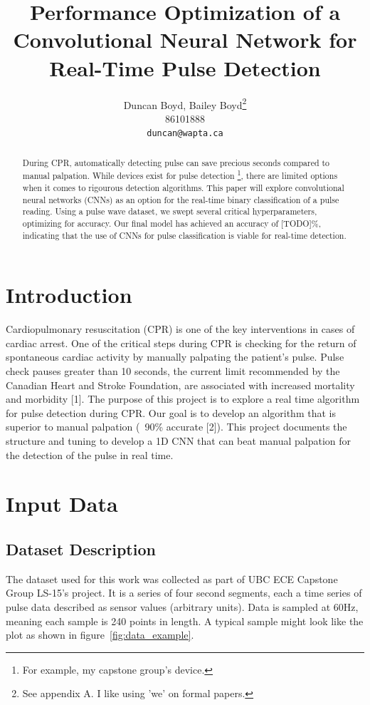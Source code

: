\documentclass{article}
\title{Performance Optimization of a Convolutional Neural Network for Real-Time Pulse Detection}
\author{
  Duncan Boyd, Bailey Boyd\thanks{See appendix A. I like using 'we' on formal papers.} \\
  86101888 \\
  \texttt{duncan@wapta.ca} \\
}
\begin{document}
\maketitle


\begin{abstract}
  During CPR, automatically detecting pulse can save precious seconds compared to manual palpation. While devices exist for pulse detection \footnote{For example, my capstone group's device.}, there are limited options when it comes to rigourous detection algorithms. This paper will explore convolutional neural networks (CNNs) as an option for the real-time binary classification of a pulse reading. Using a pulse wave dataset, we swept several critical hyperparameters, optimizing for accuracy. Our final model has achieved an accuracy of [TODO]\%, indicating that the use of CNNs for pulse classification is viable for real-time detection.
\end{abstract}

\section{Introduction}

Cardiopulmonary resuscitation (CPR) is one of the key interventions in cases of cardiac arrest. One of the critical steps during CPR is checking for the return of spontaneous cardiac activity by manually palpating the patient's pulse. Pulse check pauses greater than 10 seconds, the current limit recommended by the Canadian Heart and Stroke Foundation, are associated with increased mortality and morbidity [1]. The purpose of this project is to explore a real time algorithm for pulse detection during CPR. Our goal is to develop an algorithm that is superior to manual palpation (~90\% accurate [2]). This project documents the structure and tuning to develop a 1D CNN that can beat manual palpation for the detection of the pulse in real time.

\section{Input Data}

\subsection{Dataset Description}

The dataset used for this work was collected as part of UBC ECE Capstone Group LS-15's project. It is a series of four second segments, each a time series of pulse data described as sensor values (arbitrary units). Data is sampled at 60Hz, meaning each sample is 240 points in length. A typical sample might look like the plot as shown in figure~\ref{fig:data_example}.
\end{document}
